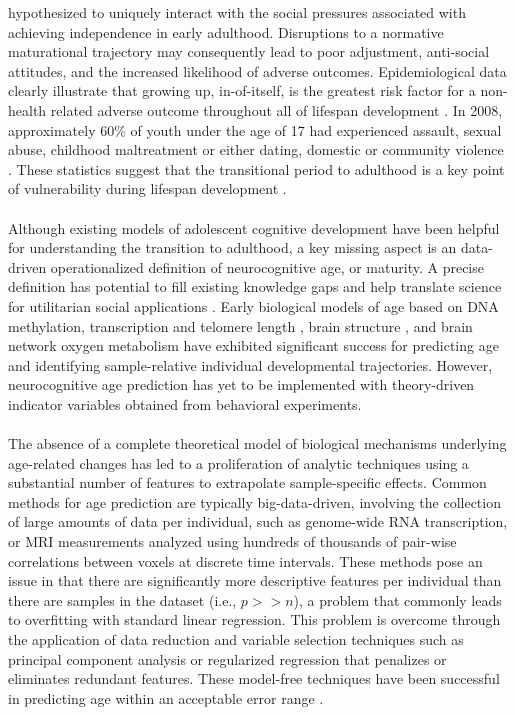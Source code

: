 \documentclass[utf8]{frontiersSCNS} %
\begin{document}
hypothesized to uniquely interact with the social pressures associated with achieving independence in early adulthood. Disruptions to a normative maturational trajectory may consequently lead to poor adjustment, anti-social attitudes, and the increased likelihood of adverse outcomes. Epidemiological data clearly illustrate  that growing up, in-of-itself, is the greatest risk factor for a non-health related adverse outcome throughout all of lifespan development \citep{turner2006effect}. In 2008, approximately 60\% of youth under the age of 17 had experienced assault, sexual abuse, childhood maltreatment or either dating, domestic or community violence \citep{finkelhor2009children}.  These statistics suggest that the transitional period to adulthood is a key point of vulnerability during lifespan development \citep*{berzin2010vulnerability}. \paragraph*{} Although existing models of adolescent cognitive development have been helpful for understanding the transition to adulthood, a key missing aspect is an data-driven operationalized definition of neurocognitive age, or maturity. A precise definition has potential to fill existing knowledge gaps and help translate science for utilitarian social applications  \citep{somerville2016searching}. Early biological models of age based on DNA methylation, transcription and telomere length \citep{baker1988biomarkers, jylhava2017biological}, brain structure \citep{khundrakpam2015prediction,aycheh2018biological,madan2018predicting}, and brain network oxygen metabolism \citep{dosenbach2010prediction, qin2015predicting} have exhibited significant success for predicting age and identifying sample-relative individual developmental trajectories. However, neurocognitive age prediction has yet to be implemented with theory-driven indicator variables obtained from behavioral experiments. \paragraph*{} The absence of a complete theoretical model of biological mechanisms underlying age-related changes has led to a proliferation of analytic techniques using a substantial number of features to extrapolate sample-specific effects. Common methods for age prediction are typically big-data-driven, involving the collection of large amounts of data per individual, such as genome-wide RNA transcription, or MRI measurements analyzed using hundreds of thousands of pair-wise correlations between voxels at discrete time intervals. These methods pose an issue in that there are significantly more descriptive features per individual than there are samples in the dataset (i.e., $p >> n$), a problem that commonly leads to overfitting with standard linear regression. This problem is overcome through the application of data reduction and variable selection techniques such as principal component analysis or regularized regression that penalizes or eliminates redundant features. These model-free techniques have been successful in predicting age within an acceptable error range \citep{cole2017predicting}. 
\end{document}
